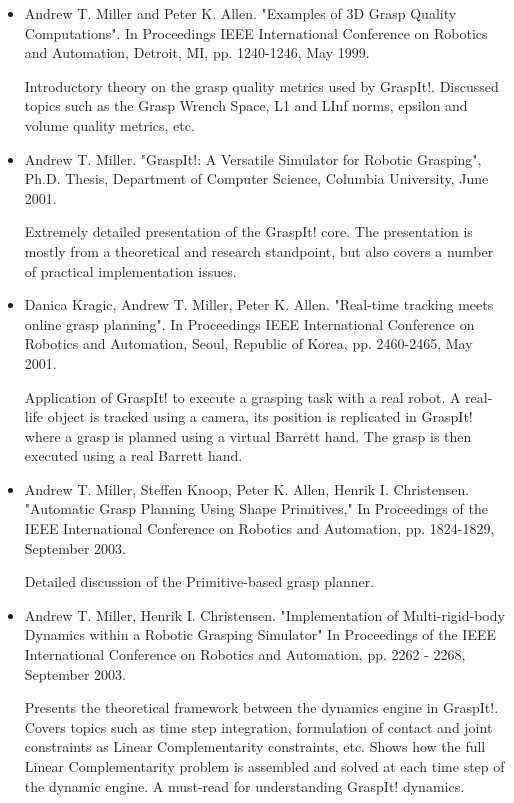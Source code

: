 \begin{itemize}

\item Andrew T. Miller and Peter K. Allen. "Examples of 3D Grasp Quality
Computations". In Proceedings IEEE International Conference on
Robotics and Automation, Detroit, MI, pp. 1240-1246, May 1999.

Introductory theory on the grasp quality metrics used by
GraspIt!. Discussed topics such as the Grasp Wrench Space, L1 and LInf
norms, epsilon and volume quality metrics, etc.

\item Andrew T. Miller. "GraspIt!: A Versatile Simulator for Robotic
Grasping", Ph.D. Thesis, Department of Computer Science, Columbia
University, June 2001.

Extremely detailed presentation of the GraspIt! core. The presentation
is mostly from a theoretical and research standpoint, but also covers
a number of practical implementation issues.

\item Danica Kragic, Andrew T. Miller, Peter K. Allen. "Real-time tracking
meets online grasp planning". In Proceedings IEEE International
Conference on Robotics and Automation, Seoul, Republic of Korea,
pp. 2460-2465, May 2001.

Application of GraspIt! to execute a grasping task with a real
robot. A real-life object is tracked using a camera, its position is
replicated in GraspIt! where a grasp is planned using a virtual
Barrett hand. The grasp is then executed using a real Barrett hand.

\item Andrew T. Miller, Steffen Knoop, Peter K. Allen, Henrik
I. Christensen. "Automatic Grasp Planning Using Shape Primitives," In
Proceedings of the IEEE International Conference on Robotics and
Automation, pp. 1824-1829, September 2003.

Detailed discussion of the Primitive-based grasp planner.

\item Andrew T. Miller, Henrik I. Christensen. "Implementation of
Multi-rigid-body Dynamics within a Robotic Grasping Simulator" In
Proceedings of the IEEE International Conference on Robotics and
Automation, pp. 2262 - 2268, September 2003.

Presents the theoretical framework between the dynamics engine in
GraspIt!. Covers topics such as time step integration, formulation of
contact and joint constraints as Linear Complementarity constraints,
etc. Shows how the full Linear Complementarity problem is assembled and
solved at each time step of the dynamic engine. A must-read for
understanding GraspIt! dynamics.


\end{itemize}
